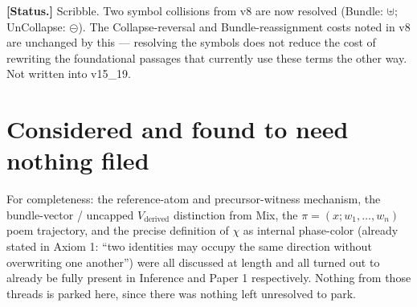 \documentclass[11pt]{article}
\begin{document}
\textbf{[Status.]} Scribble. Two symbol collisions from v8 are now
resolved (Bundle: $\uplus$; UnCollapse: $\circleddash$). The
Collapse-reversal and Bundle-reassignment costs noted in v8 are
unchanged by this --- resolving the symbols does not reduce the cost
of rewriting the foundational passages that currently use these terms
the other way. Not written into v15\_19.





\section{Considered and found to need nothing filed}

For completeness: the reference-atom and precursor-witness mechanism,
the bundle-vector / uncapped $V_{\text{derived}}$ distinction from
Mix, the $\pi=(x;w_1,\ldots,w_n)$ poem trajectory, and the precise
definition of $\chi$ as internal phase-color (already stated in
Axiom 1: ``two identities may occupy the same direction without
overwriting one another'') were all discussed at length and all
turned out to already be fully present in Inference and Paper 1
respectively. Nothing from those threads is parked here, since there
was nothing left unresolved to park.
\end{document}

